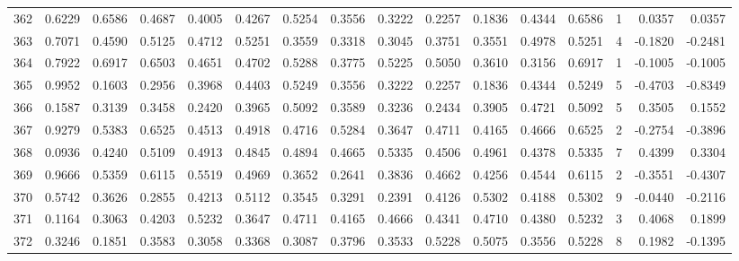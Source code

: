 \begin{tabular}{lrrrrrrrrrrrrrrr}
362 &      0.6229 &  0.6586 &  0.4687 &  0.4005 &  0.4267 &  0.5254 &  0.3556 &  0.3222 &  0.2257 &  0.1836 &   0.4344 &     0.6586 &      1 &                    0.0357 &                     0.0357 \\
363 &      0.7071 &  0.4590 &  0.5125 &  0.4712 &  0.5251 &  0.3559 &  0.3318 &  0.3045 &  0.3751 &  0.3551 &   0.4978 &     0.5251 &      4 &                   -0.1820 &                    -0.2481 \\
364 &      0.7922 &  0.6917 &  0.6503 &  0.4651 &  0.4702 &  0.5288 &  0.3775 &  0.5225 &  0.5050 &  0.3610 &   0.3156 &     0.6917 &      1 &                   -0.1005 &                    -0.1005 \\
365 &      0.9952 &  0.1603 &  0.2956 &  0.3968 &  0.4403 &  0.5249 &  0.3556 &  0.3222 &  0.2257 &  0.1836 &   0.4344 &     0.5249 &      5 &                   -0.4703 &                    -0.8349 \\
366 &      0.1587 &  0.3139 &  0.3458 &  0.2420 &  0.3965 &  0.5092 &  0.3589 &  0.3236 &  0.2434 &  0.3905 &   0.4721 &     0.5092 &      5 &                    0.3505 &                     0.1552 \\
367 &      0.9279 &  0.5383 &  0.6525 &  0.4513 &  0.4918 &  0.4716 &  0.5284 &  0.3647 &  0.4711 &  0.4165 &   0.4666 &     0.6525 &      2 &                   -0.2754 &                    -0.3896 \\
368 &      0.0936 &  0.4240 &  0.5109 &  0.4913 &  0.4845 &  0.4894 &  0.4665 &  0.5335 &  0.4506 &  0.4961 &   0.4378 &     0.5335 &      7 &                    0.4399 &                     0.3304 \\
369 &      0.9666 &  0.5359 &  0.6115 &  0.5519 &  0.4969 &  0.3652 &  0.2641 &  0.3836 &  0.4662 &  0.4256 &   0.4544 &     0.6115 &      2 &                   -0.3551 &                    -0.4307 \\
370 &      0.5742 &  0.3626 &  0.2855 &  0.4213 &  0.5112 &  0.3545 &  0.3291 &  0.2391 &  0.4126 &  0.5302 &   0.4188 &     0.5302 &      9 &                   -0.0440 &                    -0.2116 \\
371 &      0.1164 &  0.3063 &  0.4203 &  0.5232 &  0.3647 &  0.4711 &  0.4165 &  0.4666 &  0.4341 &  0.4710 &   0.4380 &     0.5232 &      3 &                    0.4068 &                     0.1899 \\
372 &      0.3246 &  0.1851 &  0.3583 &  0.3058 &  0.3368 &  0.3087 &  0.3796 &  0.3533 &  0.5228 &  0.5075 &   0.3556 &     0.5228 &      8 &                    0.1982 &                    -0.1395 \\

\end{tabular}

